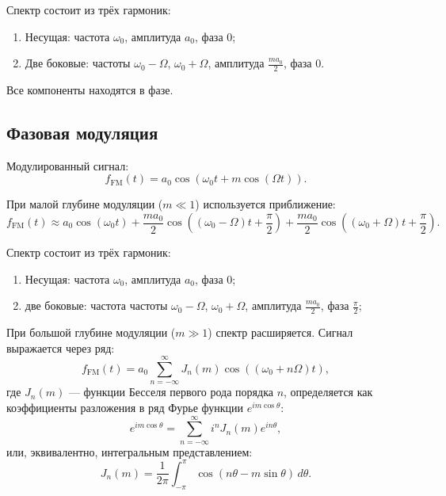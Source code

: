\documentclass[a4paper]{article}
\begin{document}
Спектр состоит из трёх гармоник:
\begin{enumerate}
\item Несущая: частота $\omega_0$, амплитуда $a_0$, фаза $0$;
\item Две боковые: частоты $\omega_0 - \Omega$, $\omega_0 + \Omega$,  амплитуда $\frac{m a_0}{2}$, фаза $0$.
\end{enumerate}

Все компоненты находятся в фазе.
\subsection*{Фазовая модуляция}

Модулированный сигнал:
\begin{equation}
f_{\text{FM}}(t) = a_0 \cos\left(\omega_0 t + m \cos(\Omega t)\right).
\end{equation}

При малой глубине модуляции ($m \ll 1$) используется приближение:
\begin{equation}
f_{\text{FM}}(t) \approx a_0 \cos(\omega_0 t) + \frac{m a_0}{2} \cos\left((\omega_0 - \Omega)t + \frac{\pi}{2}\right) + \frac{m a_0}{2} \cos\left((\omega_0 + \Omega)t + \frac{\pi}{2}\right).
\end{equation}

Спектр состоит из трёх гармоник:
\begin{enumerate}
\item Несущая: частота $\omega_0$, амплитуда $a_0$, фаза $0$;
   \item две боковые: частота частоты $\omega_0 - \Omega$, $\omega_0 + \Omega$, амплитуда $\frac{m a_0}{2}$, фаза $\frac{\pi}{2}$;
\end{enumerate}

При большой глубине модуляции ($m \gg 1$) спектр расширяется. Сигнал выражается через ряд:
\begin{equation}
f_{\text{FM}}(t) = a_0 \sum_{n=-\infty}^{\infty} J_n(m) \cos\left((\omega_0 + n\Omega)t\right),
\end{equation}
где $J_n(m)$ — функции Бесселя первого рода порядка $n$, определяется как коэффициенты разложения в ряд Фурье функции $e^{i m \cos \theta}$:
\begin{equation}
e^{i m \cos \theta} = \sum_{n=-\infty}^{\infty} i^n J_n(m) e^{i n \theta},
\end{equation}
или, эквивалентно, интегральным представлением:
\begin{equation}
J_n(m) = \frac{1}{2\pi} \int_{-\pi}^{\pi} \cos(n\theta - m \sin\theta)\, d\theta.
\end{equation}
\end{document}
